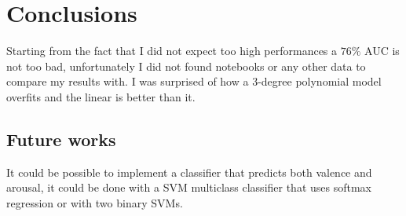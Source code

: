 \section{Conclusions}
Starting from the fact that I did not expect too high performances a $76\%$ AUC is not too bad, unfortunately I did not found notebooks or any other data to compare my results with.
I was surprised of how a 3-degree polynomial model overfits and the linear is better than it.
\subsection{Future works}
It could be possible to implement a classifier that predicts both valence and arousal, it could be done with a SVM multiclass classifier that uses softmax regression or with two binary SVMs. 
